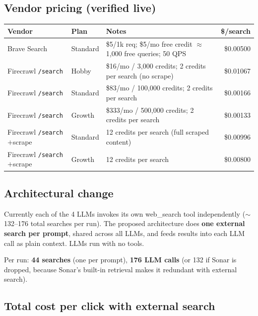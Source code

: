 \documentclass[11pt,letterpaper]{article}
\begin{document}
\subsection{Vendor pricing (verified live)}

\begin{center}
\begin{tabular}{@{}lllr@{}}
\toprule
\textbf{Vendor} & \textbf{Plan} & \textbf{Notes} & \textbf{\$/search} \\
\midrule
Brave Search    & Standard      & \$5/1k req; \$5/mo free credit $\approx$ 1,000 free queries; 50 QPS & \$0.00500 \\
Firecrawl \texttt{/search} & Hobby    & \$16/mo / 3,000 credits; 2 credits per search (no scrape) & \$0.01067 \\
Firecrawl \texttt{/search} & Standard & \$83/mo / 100,000 credits; 2 credits per search           & \$0.00166 \\
Firecrawl \texttt{/search} & Growth   & \$333/mo / 500,000 credits; 2 credits per search          & \$0.00133 \\
Firecrawl \texttt{/search} $+$scrape & Standard & 12 credits per search (full scraped content) & \$0.00996 \\
Firecrawl \texttt{/search} $+$scrape & Growth   & 12 credits per search                         & \$0.00800 \\
\bottomrule
\end{tabular}
\end{center}

\subsection{Architectural change}

Currently each of the 4 LLMs invokes its own web\_search tool independently
($\sim$132--176 total searches per run). The proposed architecture does
\textbf{one external search per prompt}, shared across all LLMs, and feeds
results into each LLM call as plain context. LLMs run with no tools.

Per run: \textbf{44 searches} (one per prompt), \textbf{176 LLM calls} (or
132 if Sonar is dropped, because Sonar's built-in retrieval makes it
redundant with external search).

\subsection{Total cost per click with external search}
\end{document}
